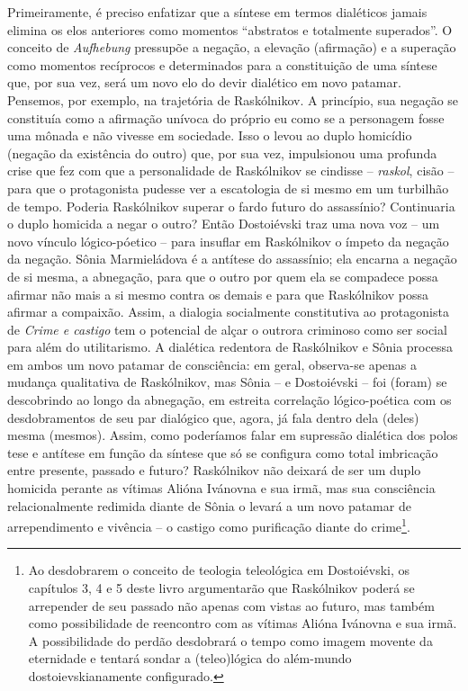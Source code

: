Primeiramente, é preciso enfatizar que a síntese em termos dialéticos
jamais elimina os elos anteriores como momentos ``abstratos e totalmente
superados''. O conceito de \emph{Aufhebung} pressupõe a negação, a
elevação (afirmação) e a superação como momentos recíprocos e
determinados para a constituição de uma síntese que, por sua vez, será
um novo elo do devir dialético em novo patamar. Pensemos, por exemplo,
na trajetória de Raskólnikov. A princípio, sua negação se constituía
como a afirmação unívoca do próprio eu como se a personagem fosse uma
mônada e não vivesse em sociedade. Isso o levou ao duplo homicídio
(negação da existência do outro) que, por sua vez, impulsionou uma
profunda crise que fez com que a personalidade de Raskólnikov se
cindisse -- \emph{raskol}, cisão -- para que o protagonista pudesse ver
a escatologia de si mesmo em um turbilhão de tempo. Poderia Raskólnikov
superar o fardo futuro do assassínio? Continuaria o duplo homicida a
negar o outro? Então Dostoiévski traz uma nova voz -- um novo vínculo
lógico-póetico -- para insuflar em Raskólnikov o ímpeto da negação da
negação. Sônia Marmieládova é a antítese do assassínio; ela encarna a
negação de si mesma, a abnegação, para que o outro por quem ela se
compadece possa afirmar não mais a si mesmo contra os demais e para que
Raskólnikov possa afirmar a compaixão. Assim, a dialogia socialmente
constitutiva ao protagonista de \emph{Crime e castigo} tem o potencial
de alçar o outrora criminoso como ser social para além do utilitarismo.
A dialética redentora de Raskólnikov e Sônia processa em ambos um novo
patamar de consciência: em geral, observa-se apenas a mudança
qualitativa de Raskólnikov, mas Sônia -- e Dostoiévski -- foi (foram) se
descobrindo ao longo da abnegação, em estreita correlação lógico-poética
com os desdobramentos de seu par dialógico que, agora, já fala dentro
dela (deles) mesma (mesmos). Assim, como poderíamos falar em supressão
dialética dos polos tese e antítese em função da síntese que só se
configura como total imbricação entre presente, passado e futuro?
Raskólnikov não deixará de ser um duplo homicida perante as vítimas
Alióna Ivánovna e sua irmã, mas sua consciência relacionalmente redimida
diante de Sônia o levará a um novo patamar de arrependimento e vivência
-- o castigo como purificação diante do crime\footnote{Ao desdobrarem o
  conceito de teologia teleológica em Dostoiévski, os capítulos 3, 4 e 5
  deste livro argumentarão que Raskólnikov poderá se arrepender de seu
  passado não apenas com vistas ao futuro, mas também como possibilidade
  de reencontro com as vítimas Alióna Ivánovna e sua irmã. A
  possibilidade do perdão desdobrará o tempo como imagem movente da
  eternidade e tentará sondar a (teleo)lógica do além-mundo
  dostoievskianamente configurado.}.

